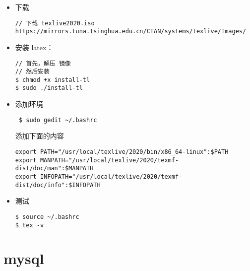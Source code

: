 \begin{itemize}
\item 下载
\begin{lstlisting}
// 下载 texlive2020.iso
https://mirrors.tuna.tsinghua.edu.cn/CTAN/systems/texlive/Images/
\end{lstlisting}

\item 安装 latex：
\begin{lstlisting}
// 首先，解压 镜像
// 然后安装
$ chmod +x install-tl
$ sudo ./install-tl
\end{lstlisting}

\item 添加环境
 \begin{lstlisting}
 $ sudo gedit ~/.bashrc
 \end{lstlisting}
  
添加下面的内容
\begin{lstlisting}
export PATH="/usr/local/texlive/2020/bin/x86_64-linux":$PATH
export MANPATH="/usr/local/texlive/2020/texmf-dist/doc/man":$MANPATH
export INFOPATH="/usr/local/texlive/2020/texmf-dist/doc/info":$INFOPATH
\end{lstlisting}

\item 测试
\begin{lstlisting}
$ source ~/.bashrc
$ tex -v
\end{lstlisting}
\end{itemize}
\newpage

\section{mysql}

